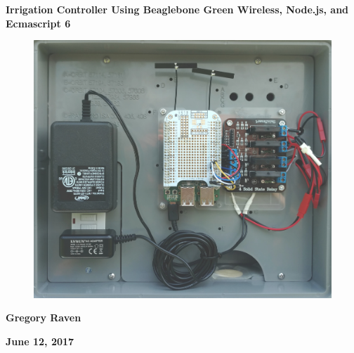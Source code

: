 \thispagestyle{empty}
{\centering\bfseries\color{black}\Huge
Irrigation Controller Using Beaglebone Green Wireless, Node.js, and Ecmascript 6
\par}

\bigskip

\begin{figure}
	\centering
	\includegraphics[width=\textwidth]{photos/cover_photo}
\end{figure}

\bigskip
{\centering\bfseries\Large
Gregory Raven
\par}


\bigskip
{\centering\bfseries\LARGE
June 12, 2017
\par}



